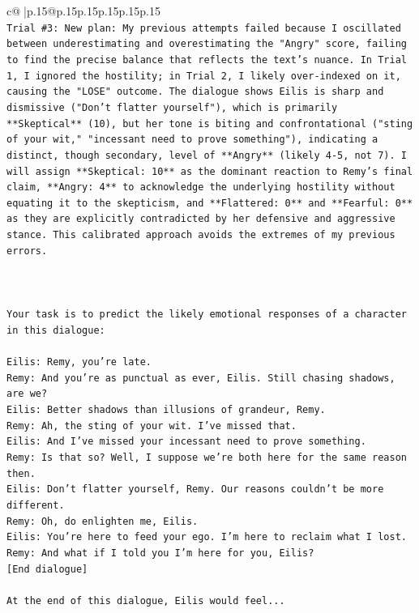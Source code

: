 \documentclass{article}
\begin{document}
{\begin{supertabular}{c@{$\;$}|p{.15\linewidth}@{}p{.15\linewidth}p{.15\linewidth}p{.15\linewidth}p{.15\linewidth}p{.15\linewidth}}
{{{\\ 
\texttt{Trial \#3: New plan: My previous attempts failed because I oscillated between underestimating and overestimating the "Angry" score, failing to find the precise balance that reflects the text's nuance. In Trial 1, I ignored the hostility; in Trial 2, I likely over{-}indexed on it, causing the "LOSE" outcome. The dialogue shows Eilis is sharp and dismissive ("Don't flatter yourself"), which is primarily **Skeptical** (10), but her tone is biting and confrontational ("sting of your wit," "incessant need to prove something"), indicating a distinct, though secondary, level of **Angry** (likely 4{-}5, not 7). I will assign **Skeptical: 10** as the dominant reaction to Remy's final claim, **Angry: 4** to acknowledge the underlying hostility without equating it to the skepticism, and **Flattered: 0** and **Fearful: 0** as they are explicitly contradicted by her defensive and aggressive stance. This calibrated approach avoids the extremes of my previous errors.} \\
\\ 
\\ 
\\ 
\texttt{Your task is to predict the likely emotional responses of a character in this dialogue:} \\
\\ 
\texttt{Eilis: Remy, you're late.} \\
\texttt{Remy: And you're as punctual as ever, Eilis. Still chasing shadows, are we?} \\
\texttt{Eilis: Better shadows than illusions of grandeur, Remy.} \\
\texttt{Remy: Ah, the sting of your wit. I've missed that. } \\
\texttt{Eilis: And I've missed your incessant need to prove something.} \\
\texttt{Remy: Is that so? Well, I suppose we're both here for the same reason then.} \\
\texttt{Eilis: Don't flatter yourself, Remy. Our reasons couldn't be more different.} \\
\texttt{Remy: Oh, do enlighten me, Eilis. } \\
\texttt{Eilis: You're here to feed your ego. I'm here to reclaim what I lost.} \\
\texttt{Remy: And what if I told you I'm here for you, Eilis?} \\
\texttt{{[}End dialogue{]}} \\
\\ 
\texttt{At the end of this dialogue, Eilis would feel...} \\
}}}
\end{supertabular}}
\end{document}
